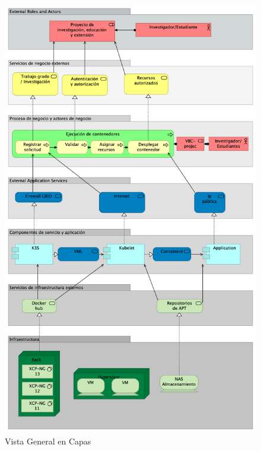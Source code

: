 \begin{figure}[H]
    \centering
    \includegraphics[scale=0.5]{tablas-images/cp6/Layered-View.png}
    \caption{Vista General en Capas}
\end{figure}